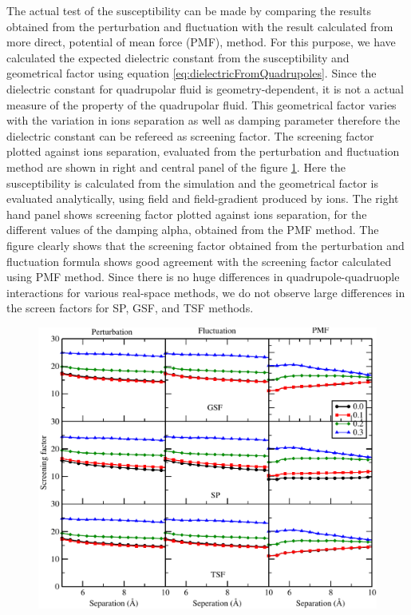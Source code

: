 The actual test of the susceptibility can be made by comparing the results obtained from the perturbation and fluctuation with the result calculated from more direct, potential of mean force (PMF), method. For this purpose, we have calculated the expected dielectric constant from the susceptibility and geometrical factor using equation \ref{eq:dielectricFromQuadrupoles}. Since the dielectric constant for quadrupolar fluid is geometry-dependent, it is not a actual measure of the property of the quadrupolar fluid. This geometrical factor varies with the variation in ions separation as well as damping parameter therefore the dielectric constant can be refereed as screening factor. The screening factor plotted against ions separation, evaluated from the perturbation and fluctuation method are shown in right and central panel of the figure \ref{fig:screenQuad}. Here the susceptibility is calculated from the simulation and the geometrical factor is evaluated analytically, using field and field-gradient produced by ions. The right hand panel shows screening factor plotted against ions separation, for the different values of the damping alpha, obtained from the PMF method. The figure clearly shows that the screening factor obtained from the perturbation and fluctuation formula shows good agreement with the screening factor calculated using PMF method. Since there is no huge differences in quadrupole-quadruople interactions for various real-space methods, we do not observe large differences in the screen factors for SP, GSF, and TSF methods.        

\begin{figure}
  \centering
  \includegraphics[width=\linewidth]{ScreeningFactor_Quad.pdf}
\caption{}
\label{fig:screenQuad}
\end{figure}

